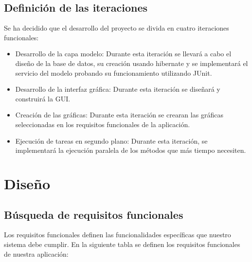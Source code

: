 \documentclass[12pt, a4paper]{book}
\begin{document}
\newpage

\section{Definición de las iteraciones}

Se ha decidido que el desarrollo del proyecto se divida en cuatro iteraciones funcionales:

\begin{itemize}
	\item Desarrollo de la capa modelo: Durante esta iteración se llevará a cabo el diseño de la base de datos, su creación usando hibernate y se implementará el servicio del modelo probando su funcionamiento utilizando JUnit. 
	\item Desarrollo de la interfaz gráfica: Durante esta iteración se diseñará y construirá la \gls{GUI}.
	\item Creación de las gráficas: Durante esta iteración se crearan las gráficas seleccionadas en los requisitos funcionales de la aplicación.
	\item Ejecución de tareas en segundo plano: Durante esta iteración, se implementará la ejecución paralela de los métodos que más tiempo necesiten.
\end{itemize}

\newpage
\chapter{Diseño}

\section{Búsqueda de requisitos funcionales}

Los requisitos funcionales definen las funcionalidades específicas que nuestro sistema debe cumplir. En la siguiente tabla se definen los requisitos funcionales de nuestra aplicación:
\end{document}
